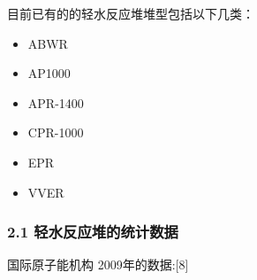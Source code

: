 目前已有的的轻水反应堆堆型包括以下几类：
\begin{itemize}
\item ABWR
\item AP1000
\item APR-1400
\item CPR-1000
\item EPR
\item VVER
\end{itemize}

\subsubsection{2.1 轻水反应堆的统计数据}

国际原子能机构 2009年的数据:[8]
